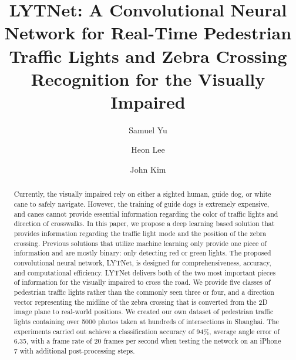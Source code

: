 \documentclass[runningheads]{llncs}
\begin{document}
%
\title{LYTNet: A Convolutional Neural Network for Real-Time Pedestrian Traffic Lights and Zebra Crossing Recognition for the Visually Impaired}

%
\author{Samuel Yu \and
Heon Lee \and
John Kim}

%
%

%
\maketitle              %
%
\begin{abstract}
Currently, the visually impaired rely on either a sighted human, guide dog, or white cane to safely navigate. However, the training of guide dogs is extremely expensive, and canes cannot provide essential information regarding the color of traffic lights and direction of crosswalks. In this paper, we propose a deep learning based solution that provides information regarding the traffic light mode and the position of the  zebra crossing. Previous solutions that utilize machine learning only provide one piece of information and are mostly binary: only detecting red or green lights. The proposed convolutional neural network, LYTNet, is designed for comprehensiveness, accuracy, and computational efficiency. LYTNet delivers both of the two most important pieces of information for the visually impaired to cross the road. We provide five classes of pedestrian traffic lights rather than the commonly seen three or four, and a direction vector representing the midline of the zebra crossing that is converted from the 2D image plane to real-world positions. We created our own dataset of pedestrian traffic lights containing over 5000 photos taken at hundreds of intersections in Shanghai. The experiments carried out achieve a classification accuracy of 94\%, average angle error of 6.35\degree, with a frame rate of 20 frames per second when testing the network on an iPhone 7 with additional post-processing steps.

\end{abstract}
%
%
%
\end{document}
